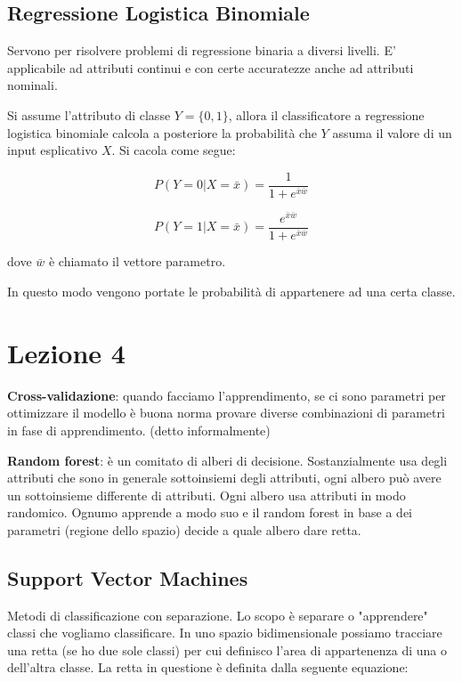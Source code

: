 \documentclass[12pt, a4paper,titlepage,openany]{article}
\begin{document}
\subsection{Regressione Logistica Binomiale}

Servono per risolvere problemi di regressione binaria a diversi livelli. E' applicabile ad attributi continui e con certe accuratezze anche ad attributi nominali.

Si assume l'attributo di classe $Y = \{0,1\}$, allora il classificatore a regressione logistica binomiale calcola a posteriore la probabilit\`a che $Y$ assuma il valore di un input esplicativo $X$. Si cacola come segue:

\[P(Y = 0 | X= \bar{x}) = \frac{1}{1+e^{\bar{x}  \bar{w}}}\]

\[P(Y = 1 | X= \bar{x}) = \frac{e^{\bar{x}  \bar{w}}}{1+e^{\bar{x}  \bar{w}}}\]

dove $\bar{w}$ \`e chiamato il vettore parametro.

In questo modo vengono portate le probabilità di appartenere ad una certa classe.	

\section{Lezione 4}

\textbf{Cross-validazione}: quando facciamo l'apprendimento, se ci sono parametri per ottimizzare il modello è buona norma provare diverse combinazioni di parametri in fase di apprendimento. (detto informalmente)

\textbf{Random forest}: \`e un comitato di alberi di decisione. Sostanzialmente usa degli attributi che sono in generale sottoinsiemi degli attributi, ogni albero può avere un sottoinsieme differente di attributi. Ogni albero usa attributi in modo randomico. Ognumo apprende a modo suo e il random forest in base a dei parametri (regione dello spazio) decide a quale albero dare retta. 

\subsection{Support Vector Machines}
Metodi di classificazione con separazione. Lo scopo \`e separare o "apprendere" classi che vogliamo classificare. In uno spazio bidimensionale possiamo tracciare una retta (se ho due sole classi) per cui definisco l'area di appartenenza di una o dell'altra classe. La retta in questione è definita dalla seguente equazione:
\end{document}
